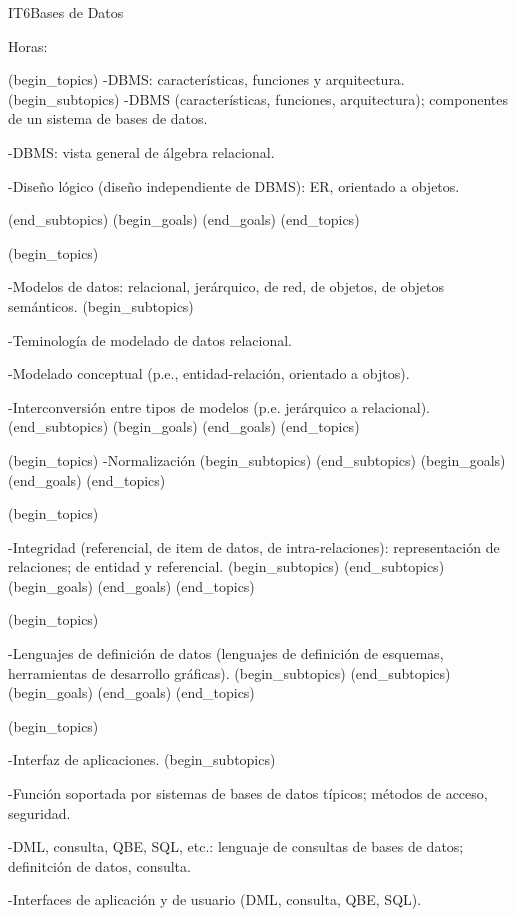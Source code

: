 \begin{BKL2}{IT6}{Bases de Datos}

Horas:
 
(begin_topics)
-DBMS: características, funciones y arquitectura.
(begin_subtopics)
-DBMS (características, funciones, arquitectura); componentes de un sistema de bases de datos.

-DBMS: vista general de álgebra relacional.

-Diseño lógico (diseño independiente de DBMS): ER, orientado a objetos.

(end_subtopics)
(begin_goals)
(end_goals)
(end_topics)

 

(begin_topics)

-Modelos de datos: relacional, jerárquico, de red, de objetos, de objetos semánticos.
(begin_subtopics)

-Teminología de modelado de datos relacional.

-Modelado conceptual (p.e., entidad-relación, orientado a objtos).

-Interconversión entre tipos de modelos (p.e. jerárquico a relacional).
(end_subtopics)
(begin_goals)
(end_goals)
(end_topics)

 

(begin_topics)
-Normalización
(begin_subtopics)
(end_subtopics)
(begin_goals)
(end_goals)
(end_topics)

 

(begin_topics)

-Integridad (referencial, de item de datos, de intra-relaciones): representación de relaciones; de entidad y referencial.
(begin_subtopics)
(end_subtopics)
(begin_goals)
(end_goals)
(end_topics)

 

(begin_topics)

-Lenguajes de definición de datos (lenguajes de definición de esquemas, herramientas de desarrollo gráficas).
(begin_subtopics)
(end_subtopics)
(begin_goals)
(end_goals)
(end_topics)

 

(begin_topics)

-Interfaz de aplicaciones.
(begin_subtopics)

-Función soportada por sistemas de bases de datos típicos; métodos de acceso, seguridad.

-DML, consulta, QBE, SQL, etc.: lenguaje de consultas de bases de datos; definitción de datos, consulta.

-Interfaces de aplicación y de usuario (DML, consulta, QBE, SQL).


\end{BKL2}
